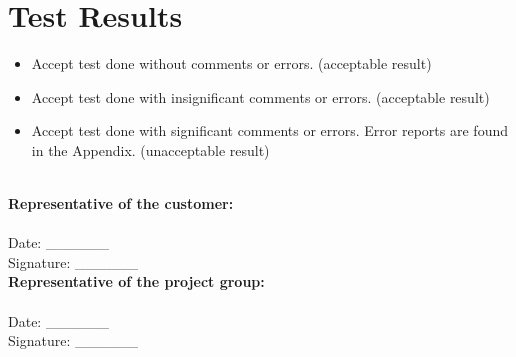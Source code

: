 \chapter{Test Results}
\begin{itemize}
	\renewcommand{\labelitemi}{\Large$\square$}
\item Accept test done without comments or errors. (acceptable result)\\
\item Accept test done with insignificant comments or errors. (acceptable result)\\
\item Accept test done with significant comments or errors. Error reports are found in the Appendix. (unacceptable result)\\
\end{itemize}
\ \\
\textbf{Representative of the customer:}\\
\ \\
Date: \_\_\_\_\_\_
\ \\
Signature: \_\_\_\_\_\_
\ \\
\textbf{Representative of the project group:}\\
\ \\
Date: \_\_\_\_\_\_
\ \\
Signature: \_\_\_\_\_\_